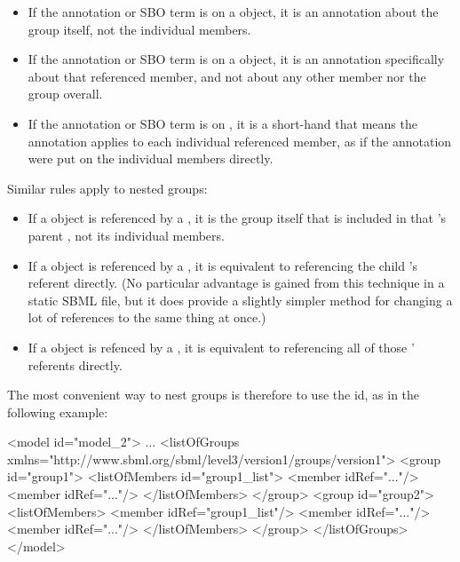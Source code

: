 \begin{itemize}

\item If the annotation or SBO term is on a \Group object, it is an annotation about the group itself, not the individual members.

\item If the annotation or SBO term is on a \Member object, it is an annotation specifically about that referenced member, and not about any other member nor the group overall.

\item If the annotation or SBO term is on \ListOfMembers, it is a short-hand that means the annotation applies to each individual referenced member, as if the annotation were put on the individual members directly.

\end{itemize}

\begin{blockChanged}
Similar rules apply to nested groups:

\begin{itemize}

\item If a \Group object is referenced by a \Member, it is the group itself that is included in that \Member's parent \Group, not its individual members.

\item If a \Member object is referenced by a \Member, it is equivalent to referencing the child \Member's referent directly.  (No particular advantage is gained from this technique in a static SBML file, but it does provide a slightly simpler method for changing a lot of references to the same thing at once.)

\item If a \ListOfMembers object is refenced by a \Member, it is equivalent to referencing all of those \ListOfMembers' referents directly.

\end{itemize}

The most convenient way to nest groups is therefore to use the \ListOfMembers id, as in the following example:

\end{blockChanged}


\begin{example}
<model id="model_2"> 
  ... 
  <listOfGroups xmlns="http://www.sbml.org/sbml/level3/version1/groups/version1"> 
    <group id="group1"> 
      <listOfMembers id="group1_list"> 
        <member idRef="..."/> 
        <member idRef="..."/> 
      </listOfMembers> 
    </group> 
    <group id="group2"> 
      <listOfMembers> 
        <member idRef="group1_list"/> 
        <member idRef="..."/> 
        <member idRef="..."/> 
      </listOfMembers> 
    </group> 
  </listOfGroups> 
</model> 
\end{example}

